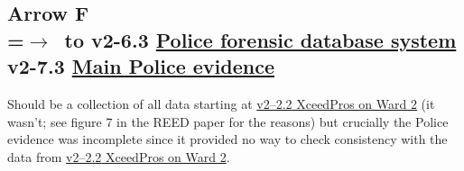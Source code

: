 \documentclass[10pt,a4wide]{article}
\begin{document}
\subsection*{Arrow   F\\
=\hbox{$\rightarrow$~}\hbox to v2-6.3 \hyperlink{11}{Police forensic database system}\\v2-7.3 \hyperlink{12}{Main Police evidence}}
Should be a collection of all data starting at \hyperlink{4}{{v2--2.2} XceedPros on Ward 2} (it wasn't; see figure 7 in the REED paper for the reasons) but crucially the Police evidence was incomplete since it provided no way to check consistency with the data from \hyperlink{4}{{v2--2.2} XceedPros on Ward 2}.
\end{document}
